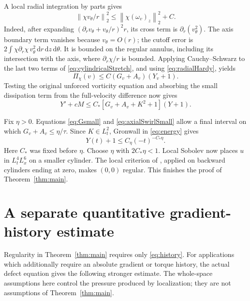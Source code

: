 \documentclass[11pt]{article}
\theoremstyle{remark}
\newcommand{\dd}{\,\mathrm d}
\newcommand{\norm}[1]{\left\lVert#1\right\rVert}
\begin{document}
A local radial integration by parts gives
\begin{equation}\label{eq:radialHardy}
 \norm{\chi v_\theta/r}_2^2
 \leq\norm{\chi(\omega_v)_z}_2^2+C.
\end{equation}
Indeed, after expanding $(\partial_r v_\theta+v_\theta/r)^2r$,
its cross term is $\partial_r(v_\theta^2)$. The axis boundary term
vanishes because $v_\theta=O(r)$; the cutoff error is
$2\int\chi\partial_r\chi\,v_\theta^2\dd r\dd z\dd\theta$.
It is bounded on the regular annulus, including its intersection with
the axis, where $\partial_r\chi/r$ is bounded.
Applying Cauchy--Schwarz to the last two terms of
\eqref{eq:cylindricalStretch}, and using \eqref{eq:radialHardy}, yields
\[
 \Pi_\chi(v)\leq C(G_v+A_v)(Y_v+1).
\]
Testing the original unforced vorticity equation and absorbing the
small dissipation term from the full-velocity difference now gives
\begin{equation}\label{eq:energy}
 Y'+cM\leq C_*[G_v+A_v+K^2+1](Y+1).
\end{equation}

Fix $\eta>0$. Equations \eqref{eq:Gsmall} and
\eqref{eq:axialSwirlSmall} allow a final interval on which
$G_v+A_v\leq\eta/\tau$. Since $K\in L^2_t$, Gronwall in
\eqref{eq:energy} gives
\[
 Y(t)+1\leq C_\eta(-t)^{-C_*\eta}.
\]
Here $C_*$ was fixed before $\eta$. Choose $\eta$ with $2C_*\eta<1$.
Local Sobolev now places $u$ in $L^4_tL^6_x$ on a smaller cylinder.
The local criterion of \cite[Theorem~1.1(i)]{GKT}, applied on backward
cylinders ending at zero, makes $(0,0)$ regular. This finishes the
proof of Theorem~\ref{thm:main}.

\section{A separate quantitative gradient-history estimate}
\label{sec:smoothing}

Regularity in Theorem~\ref{thm:main} requires only \eqref{eq:history}.
For applications which additionally require an absolute gradient or
torque history, the actual defect equation gives the following stronger
estimate. The whole-space assumptions here control the pressure produced
by localization; they are not assumptions of Theorem~\ref{thm:main}.
\end{document}

